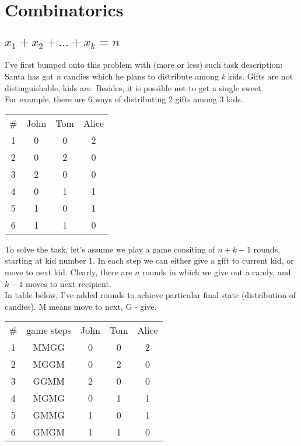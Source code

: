 \documentclass[12pt]{article}
\begin{document}
\section{Combinatorics}
\subsection{$x_1 + x_2 + ... + x_k = n$}
I've first bumped onto this problem with (more or less) such task description: Santa has got \textit{n} candies which he plans to distribute among \textit{k} kids. Gifts are not distinguishable, kids are. Besides, it is possible not to  get a single sweet.\\
For example, there are 6 ways of distributing 2 gifts among 3 kids.

\begin{center}
\begin{tabular}{ c c c c }
\# & John & Tom & Alice \\ 
1 & 0 & 0 & 2 \\
2 & 0 & 2 & 0 \\
3 & 2 & 0 & 0 \\
4 & 0 & 1 & 1 \\
5 & 1 & 0 & 1 \\
6 & 1 & 1 & 0 
\end{tabular}
\end{center}

To solve the task, let's assume we play a game consiting of $n+k-1$ rounds, starting at kid number 1. In each step we can either give a gift to current kid, or move to next kid. Clearly, there are $n$ rounds in which we give out a candy, and $k-1$ moves to next recipient.\\
In table below, I've added rounds to achieve particular final state (distribution of candies). M means move to next, G - give.

\begin{center}
\begin{tabular}{ c c c c c }
\# & game steps & John & Tom & Alice\\ 
1 & MMGG & 0 & 0 & 2 \\
2 & MGGM & 0 & 2 & 0 \\
3 & GGMM & 2 & 0 & 0 \\
4 & MGMG & 0 & 1 & 1 \\
5 & GMMG & 1 & 0 & 1 \\
6 & GMGM & 1 & 1 & 0 
\end{tabular}
\end{center}
\end{document}
